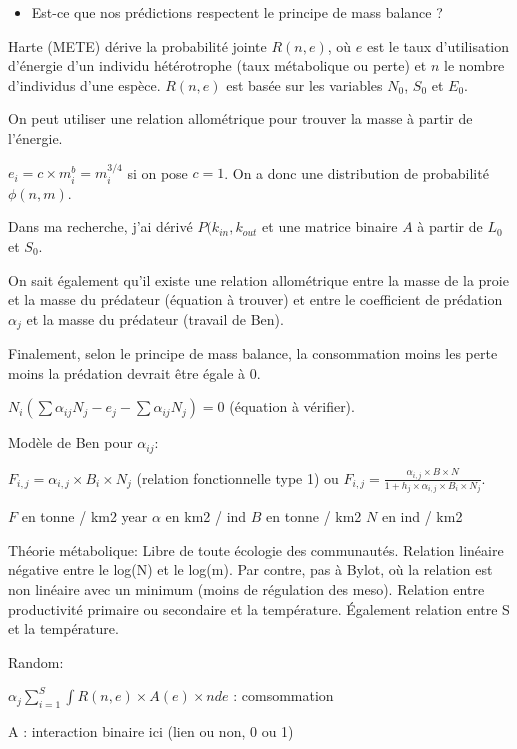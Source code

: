 \begin{itemize}
    \item Est-ce que nos prédictions respectent le principe de mass balance ?
\end{itemize}

Harte (METE) dérive la probabilité jointe $R(n, e)$, où $e$ est le taux
d'utilisation d'énergie d'un individu hétérotrophe (taux métabolique ou perte)
et $n$ le nombre d'individus d'une espèce. $R(n, e)$ est basée sur les variables
$N_0$, $S_0$ et $E_0$. 

On peut utiliser une relation allométrique pour trouver la masse à partir de
l'énergie. 

$e_i = c \times m_i^b = m_i^{3/4}$ si on pose $c = 1$. On a donc une
distribution de probabilité $\phi (n, m)$.

Dans ma recherche, j'ai dérivé $P(k_{in}, k_{out}$ et une matrice binaire $A$ à
partir de $L_0$ et $S_0$. 

On sait également qu'il existe une relation allométrique entre la masse de la
proie et la masse du prédateur (équation à trouver) et entre le coefficient de
prédation $\alpha_j$ et la masse du prédateur (travail de Ben). 

Finalement, selon le principe de mass balance, la consommation moins les perte
moins la prédation devrait être égale à 0. 

$N_i (\sum \alpha_{ij} N_j - e_j - \sum \alpha_{ij} N_j) = 0$ (équation à
vérifier). 

Modèle de Ben pour $\alpha_{ij}$:

$F_{i,j} = \alpha_{i,j} \times B_i \times N_j$ (relation fonctionnelle type 1)
ou $F_{i,j} = \frac{\alpha_{i,j} \times B \times N}{1 + h_j \times \alpha_{i,j}
\times B_i \times N_j}$. 

$F$ en tonne / km2 year $\alpha$ en km2 / ind $B$ en tonne / km2 $N$ en ind /
km2

Théorie métabolique: Libre de toute écologie des communautés. Relation linéaire négative entre le
log(N) et le log(m). Par contre, pas à Bylot, où la relation est non linéaire
avec un minimum (moins de régulation des meso). Relation entre productivité
primaire ou secondaire et la température. Également relation entre S et la
température. 

Random:

$\alpha_j \sum_{i = 1}^{S} \int R(n, e) \times A(e) \times n de$ : comsommation 

A : interaction binaire ici (lien ou non, 0 ou 1)

